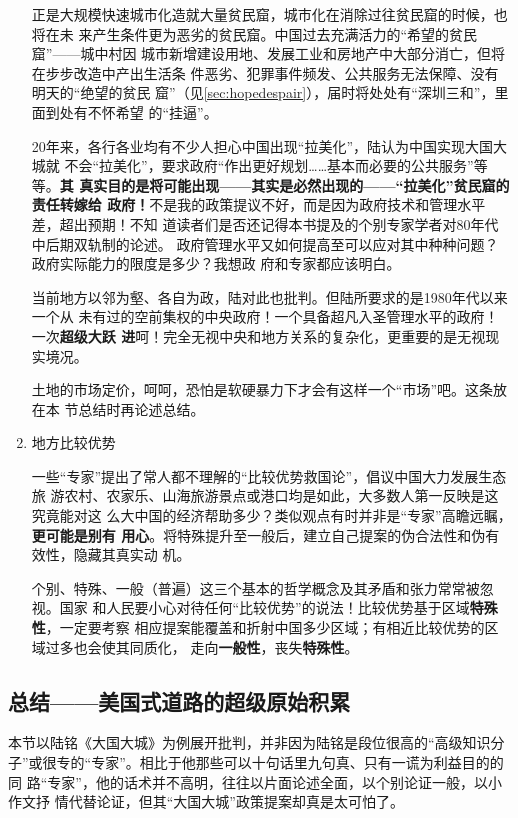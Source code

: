 \begin{enumerate}
  正是大规模快速城市化造就大量贫民窟，城市化在消除过往贫民窟的时候，也将在未
  来产生条件更为恶劣的贫民窟。中国过去充满活力的“希望的贫民窟”——城中村因
  城市新增建设用地、发展工业和房地产中大部分消亡，但将在步步改造中产出生活条
  件恶劣、犯罪事件频发、公共服务无法保障、没有明天的“绝望的贫民
  窟”（见\cref{sec:hopedespair}），届时将处处有“深圳三和”，里面到处有不怀希望
  的“挂逼”。

  20年来，各行各业均有不少人担心中国出现“拉美化”，陆认为中国实现大国大城就
  不会“拉美化”，要求政府“作出更好规划……基本而必要的公共服务”等等。\textbf{其
    真实目的是将可能出现——其实是必然出现的——“拉美化”贫民窟的责任转嫁给
    政府！}不是我的政策提议不好，而是因为政府技术和管理水平差，超出预期！不知
  道读者们是否还记得本书提及的个别专家学者对80年代中后期双轨制的论述。
  政府管理水平又如何提高至可以应对其中种种问题？政府实际能力的限度是多少？我想政
  府和专家都应该明白。

  当前地方以邻为壑、各自为政，陆对此也批判。但陆所要求的是1980年代以来一个从
  未有过的空前集权的中央政府！一个具备超凡入圣管理水平的政府！一次\textbf{超级大跃
    进}呵！完全无视中央和地方关系的复杂化，更重要的是无视现实境况。

  土地的市场定价，呵呵，恐怕是软硬暴力下才会有这样一个“市场”吧。这条放在本
  节总结时再论述总结。


\item 地方比较优势

  一些“专家”提出了常人都不理解的“比较优势救国论”，倡议中国大力发展生态旅
  游农村、农家乐、山海旅游景点或港口均是如此，大多数人第一反映是这究竟能对这
  么大中国的经济帮助多少？类似观点有时并非是“专家”高瞻远瞩，\textbf{更可能是别有
    用心}。将特殊提升至一般后，建立自己提案的伪合法性和伪有效性，隐藏其真实动
  机。

  个别、特殊、一般（普遍）这三个基本的哲学概念及其矛盾和张力常常被忽视。国家
  和人民要小心对待任何“比较优势”的说法！比较优势基于区域\textbf{特殊性}，一定要考察
  相应提案能覆盖和折射中国多少区域；有相近比较优势的区域过多也会使其同质化，
  走向\textbf{一般性}，丧失\textbf{特殊性}。

\end{enumerate}

\subsection{总结——美国式道路的超级原始积累}


本节以陆铭《大国大城》为例展开批判，并非因为陆铭是段位很高的“高级知识分
子”或很专的“专家”。相比于他那些可以十句话里九句真、只有一谎为利益目的的同
路“专家”，他的话术并不高明，往往以片面论述全面，以个别论证一般，以小作文抒
情代替论证，但其“大国大城”政策提案却真是太可怕了。

